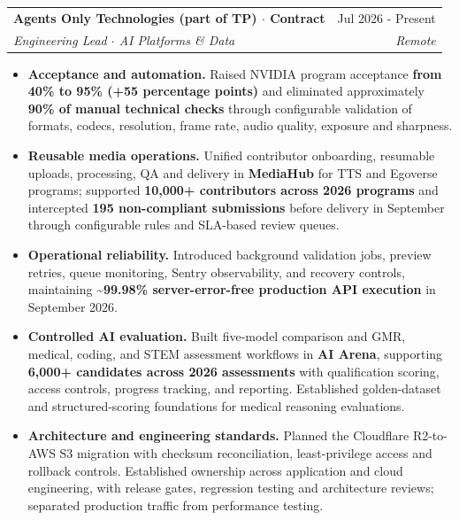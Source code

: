 \documentclass[letterpaper,11pt]{article}
\makeatletter
\newcommand{\resumeItem}[1]{
  \item\small{
    {#1 \vspace{-2pt}}
  }
}
\newcommand{\resumeSubheading}[4]{
  \vspace{-2pt}\item
    \begin{tabular*}{0.97\textwidth}[t]{l@{\extracolsep{\fill}}r}
      \textbf{#1} & #2 \\
      \textit{\small#3} & \textit{\small #4} \\
    \end{tabular*}\vspace{-7pt}
}
\newcommand{\resumeItemListStart}{\begin{itemize}}
\newcommand{\resumeItemListEnd}{\end{itemize}\vspace{-5pt}}
\newcommand{\sep}{\(\cdot\)}
\makeatother
\begin{document}
    \resumeSubheading
      {Agents Only Technologies (part of TP) \sep{} Contract}{Jul 2026 - Present}
      {Engineering Lead \sep{} AI Platforms \& Data}{Remote}
      \resumeItemListStart
        \resumeItem{\textbf{Acceptance and automation.} Raised NVIDIA program acceptance \textbf{from 40\% to 95\% (+55 percentage points)} and eliminated approximately \textbf{90\% of manual technical checks} through configurable validation of formats, codecs, resolution, frame rate, audio quality, exposure and sharpness.}
        \resumeItem{\textbf{Reusable media operations.} Unified contributor onboarding, resumable uploads, processing, QA and delivery in \textbf{MediaHub} for TTS and Egoverse programs; supported \textbf{10,000+ contributors across 2026 programs} and intercepted \textbf{195 non-compliant submissions} before delivery in September through configurable rules and SLA-based review queues.}
        \resumeItem{\textbf{Operational reliability.} Introduced background validation jobs, preview retries, queue monitoring, Sentry observability, and recovery controls, maintaining \textbf{\textasciitilde{}99.98\% server-error-free production API execution} in September 2026.}
        \resumeItem{\textbf{Controlled AI evaluation.} Built five-model comparison and GMR, medical, coding, and STEM assessment workflows in \textbf{AI Arena}, supporting \textbf{6,000+ candidates across 2026 assessments} with qualification scoring, access controls, progress tracking, and reporting. Established golden-dataset and structured-scoring foundations for medical reasoning evaluations.}
        \resumeItem{\textbf{Architecture and engineering standards.} Planned the Cloudflare R2-to-AWS S3 migration with checksum reconciliation, least-privilege access and rollback controls. Established ownership across application and cloud engineering, with release gates, regression testing and architecture reviews; separated production traffic from performance testing.}
      \resumeItemListEnd
\end{document}
